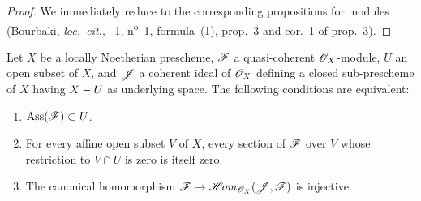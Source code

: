 \begin{proof}
We immediately reduce to the corresponding propositions for modules (Bourbaki, \emph{loc.\ cit.}, \textsection~1, n\textsuperscript{o}~1, formula~(1), prop.~3 and cor.~1 of prop.~3).
\end{proof}


\begin{proposition}[3.1.8]
\label{IV.3.1.8}
Let $X$ be a locally Noetherian prescheme, $\mathscr{F}$ a quasi-coherent $\mathscr{O}_X$-module, $U$ an open subset of $X$, and $\mathscr{J}$ a coherent ideal of $\mathscr{O}_X$ defining a closed sub-prescheme of $X$ having $X- U$ as underlying space.
The following conditions are equivalent:
\begin{enumerate}
  \item[\emph{a)}] $\operatorname{Ass}(\mathscr{F})\subset U$.
  \item[\emph{b)}] For every affine open subset $V$ of $X$, every section of $\mathscr{F}$ over $V$ whose restriction to $V\cap U$ is zero is itself zero.
  \item[\emph{c)}] The canonical homomorphism $\mathscr{F}\to\mathscr{H}\!\mathit{om}_{\mathscr{O}_X}(\mathscr{J},\mathscr{F})$ is injective.
\end{enumerate}
\end{proposition}

